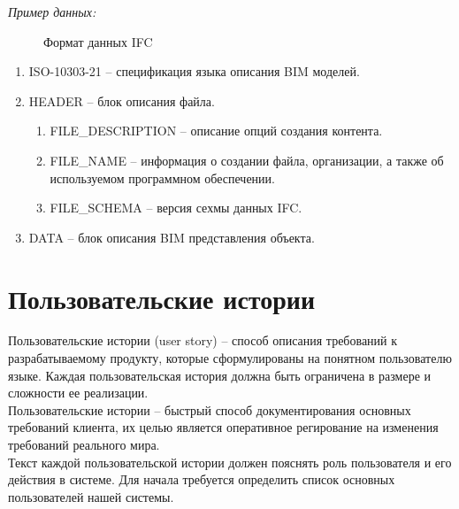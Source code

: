 \documentclass[a4paper,14pt]{extreport} %
\begin{document}
\textit{Пример данных:}
\begin{figure}[H]
\caption{Формат данных IFC}
\label{user-stories}
\end{figure}
\begin{enumerate}
\item ISO-10303-21 -- спецификация языка описания BIM моделей.
\item HEADER -- блок описания файла.
\begin{enumerate}
\item FILE\_DESCRIPTION -- описание опций создания контента.
\item FILE\_NAME -- информация о создании файла, организации, а также об используемом программном обеспечении.
\item FILE\_SCHEMA -- версия сехмы данных IFC.
\end{enumerate}
\item DATA -- блок описания BIM представления объекта.
\end{enumerate}

\newpage
\section{Пользовательские истории}

Пользовательские истории (user story) -- способ описания требований к разрабатываемому продукту, которые сформулированы на понятном пользователю языке. Каждая пользовательская история должна быть ограничена в размере и сложности ее реализации. \\
Пользовательские истории -- быстрый способ документирования основных требований клиента, их целью является оперативное регирование на изменения требований реального мира. \\
Текст каждой пользовательской истории должен пояснять роль пользователя и его действия в системе. Для начала требуется определить список основных пользователей нашей системы.
\end{document}
